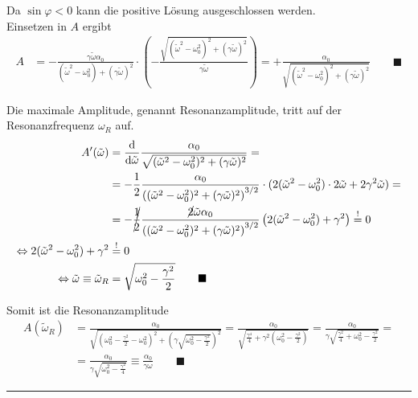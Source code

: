 \documentclass{article}
\newcommand{\diff}{\mathrm{d}}
\newcommand{\lr}[1]{\left(#1\right)}
\begin{document}
{	Da $\sin\varphi < 0$ kann die positive Lösung ausgeschlossen werden.\\
	Einsetzen in $A$ ergibt
		\begin{align*}
			A &= - \frac{\gamma\tilde{\omega}\alpha_0}{ (\tilde{\omega}^2 - \omega_0^2) + (\gamma\tilde{\omega})^2 } \cdot \lr{ -\frac{\sqrt{ (\tilde{\omega}^2 - \omega_0^2)^2 + (\gamma\tilde{\omega})^2 }}{\gamma\tilde{\omega}} } = + \frac{\alpha_0}{ \sqrt{ (\tilde{\omega}^2 - \omega_0^2)^2 + (\gamma\tilde{\omega})^2 } } \qquad \blacksquare
		\end{align*}


	Die maximale Amplitude, genannt Resonanzamplitude, tritt auf der Resonanzfrequenz $\omega_R$ auf.
		\begin{align*}
			A'(\tilde{\omega}) &= \frac{\diff}{\diff\tilde{\omega}} \frac{\alpha_0}{ \sqrt{ (\tilde{\omega}^2 - \omega_0^2)^2 + (\gamma\tilde{\omega})^2 } } = \\
			&= -\frac{1}{2} \frac{\alpha_0}{ \lr{ (\tilde{\omega}^2 - \omega_0^2)^2 + (\gamma\tilde{\omega})^2 }^{3/2} } \cdot (2(\tilde{\omega}^2 - \omega_0^2) \cdot 2\tilde{\omega} + 2\gamma^2\tilde{\omega}) = \\
			&= -\cancel{\frac{1}{2}} \frac{\cancel{2}\tilde{\omega}\alpha_0}{ \lr{ (\tilde{\omega}^2 - \omega_0^2)^2 + (\gamma\tilde{\omega})^2 }^{3/2}} \lr{ 2(\tilde{\omega}^2 - \omega_0^2) + \gamma^2 } \stackrel{!}{=} 0 \\
			\Leftrightarrow 2(\tilde{\omega}^2 - \omega_0^2) + \gamma^2 &\stackrel{!}{=} 0 \\
			\Leftrightarrow \tilde{\omega} \equiv \tilde{\omega}_R &= \sqrt{\omega_0^2 - \frac{\gamma^2}{2}} \qquad \blacksquare
		\end{align*}

	Somit ist die Resonanzamplitude
		\begin{align*}
			A(\tilde{\omega}_R) &= \frac{\alpha_0}{ \sqrt{ (\omega_0^2 - \frac{\gamma^2}{2} - \omega_0^2)^2 + (\gamma\sqrt{\omega_0^2 - \frac{\gamma^2}{2}})^2 } } = \frac{\alpha_0}{\sqrt{ \frac{\gamma^4}{4} + \gamma^2 \lr{\omega_0^2 - \frac{\gamma^2}{2}}}} = \frac{\alpha_0}{\gamma \sqrt{\frac{\gamma^2}{4} + \omega_0^2 - \frac{\gamma^2}{2}}} = \\
			&= \frac{\alpha_0}{\gamma \sqrt{\omega_0^2 - \frac{\gamma^2}{4}}} \equiv \frac{\alpha_0}{\gamma\omega} \qquad \blacksquare
		\end{align*}

\hrule
}


\newpage
\end{document}

